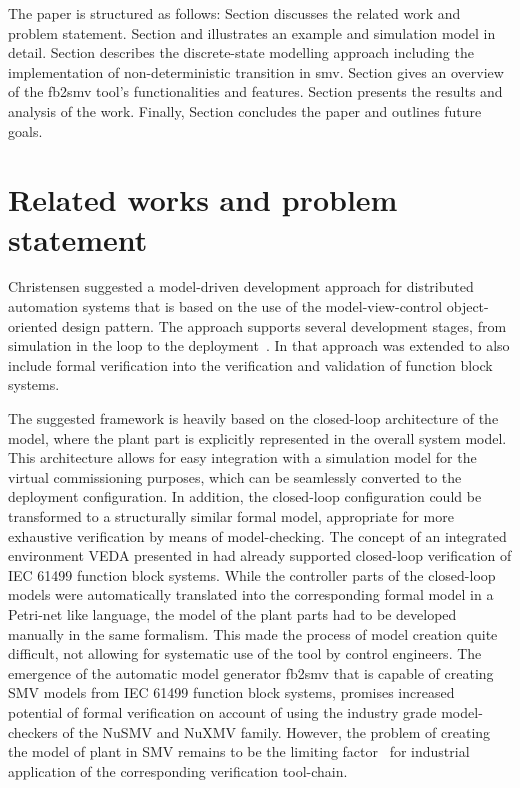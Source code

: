 \documentclass[conference]{IEEEtran}
\newcommand{\RNum}[1]{\uppercase\expandafter{\romannumeral #1\relax}}
\begin{document}
The paper is structured as follows: Section \RNum{2} discusses the related work and problem statement. Section \RNum{3} and \RNum{4} illustrates an example and  simulation model in detail. Section \RNum{5}  describes the discrete-state modelling approach including the implementation of non-deterministic transition in smv. Section \RNum{6}  gives an overview of the fb2smv tool's functionalities and features. Section \RNum{7}  presents the results and analysis of the work. Finally, Section \RNum{8} concludes the paper and outlines future goals.


\section{Related works and problem statement}

Christensen suggested a model-driven development approach \cite{christensen2000design} for distributed automation systems that is based on the use of the model-view-control object-oriented design pattern. The approach supports several development stages, from simulation in the loop to the deployment~\cite{patil2018adapting}. 
In \cite{vyatkin2008closed} that approach was extended to also include formal verification into the verification and validation of function block systems.

The suggested framework is heavily based on the closed-loop architecture of the model, where the plant part is explicitly represented in the overall system model. This architecture allows for easy integration with a simulation model for the virtual commissioning purposes, which can be seamlessly converted to the deployment configuration. In addition, the closed-loop configuration could be transformed to a structurally similar formal model, appropriate for more exhaustive verification by means of model-checking.   
The concept of an integrated environment VEDA presented in \cite{vyatkin2003verification} had already supported closed-loop verification of IEC 61499 function block systems. While the controller parts of the closed-loop models were automatically translated into the corresponding formal model in a Petri-net like language, the model of the plant parts had to be developed manually in the same formalism. 
This made the process of model creation quite difficult, not allowing for systematic use of the tool by control engineers. 
The emergence of the automatic model generator fb2smv \cite{fb2smv} that is capable of creating SMV models from IEC 61499 function block systems, promises increased potential of formal verification on account of using the industry grade model-checkers of the NuSMV \cite{cimatti2000nusmv} and NuXMV family. 
However, the problem of creating the model of plant in SMV remains to be the limiting factor~\cite{sinha2019survey} for industrial application of the corresponding verification tool-chain.
\end{document}
